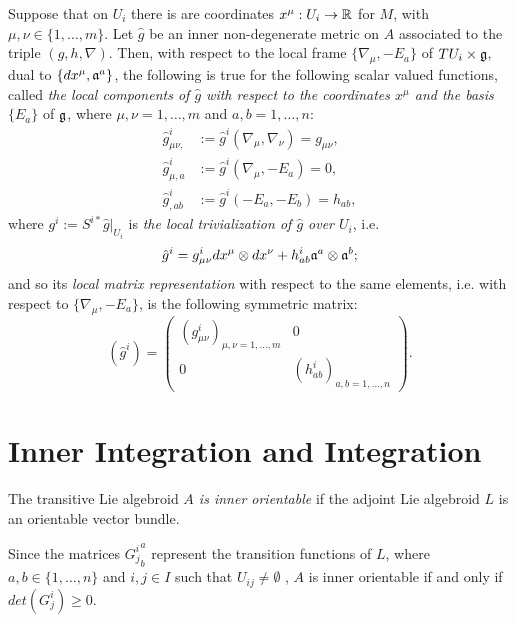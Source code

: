Suppose that on $U_i$ there is are coordinates $x^\mu: U_i \to \mathbb{R}$ for $M$, with $\mu, \nu \in \{1, \dots, m\}$. Let $\hat g$ be an inner non-degenerate metric on $A$ associated to the triple $(g, h, \nabla)$. Then, with respect to the local frame $\{\nabla_\mu, -E_a\}$ of $TU_i \times \mathfrak{g}$, dual to $\{dx^\mu, \mathfrak{a}^a\}$, the following is true for the following scalar valued functions, called \emph{the local components of $\hat g$ with respect to the coordinates $x^\mu$ and the basis $\{E_a\}$} of $\mathfrak{g}$, where $\mu, \nu = 1, \dots, m$ and $a, b = 1, \dots, n$:
\begin{align*}
    \hat g^i_{\mu \nu,}& := \hat g^i(\nabla_\mu, \nabla_\nu) = g_{\mu \nu},\\
    \hat g^i_{\mu, a} &:= \hat g^i(\nabla_\mu, -E_a)=0,\\
    \hat g^i_{,ab} &:= \hat g^i(-E_a, -E_b) = h_{ab},
\end{align*}
where $g^i := S^{i*}\hat g|_{U_i}$ is \emph{the local trivialization of $\hat g$ over $U_i$}, i.e.
\begin{equation}
    \hat g^i = g^i_{\mu \nu} dx^\mu\otimes dx^\nu + h^i_{ab} \mathfrak{a}^a \otimes \mathfrak{a}^b;
\end{equation}
and so its \emph{local matrix representation} with respect to the same elements, i.e. with respect to $\{\nabla_\mu, -E_a\}$, is the following symmetric matrix:
\begin{equation}
    (\hat g^i) = \begin{pmatrix}  (g^i_{\mu \nu})_{\mu, \nu = 1, \dots, m} & 0 \\ 0 & (h^i_{a b})_{a, b = 1, \dots, n} \end{pmatrix}.
\end{equation}


\section{Inner Integration and Integration}
\label{chIntegrationSectionIntegration}

\begin{definition}
The transitive Lie algebroid \emph{$A$ is inner orientable} if the adjoint Lie algebroid $L$ is an orientable vector bundle.
\end{definition}

Since the matrices ${G^i_j}^a_b$ represent the transition functions of $L$, where $a, b \in \{1, \dots, n\}$ and $i, j \in I$ such that $U_{ij }\neq \emptyset$ , $A$ is inner orientable if and only if $det({G^i_j}) \geq 0$.


